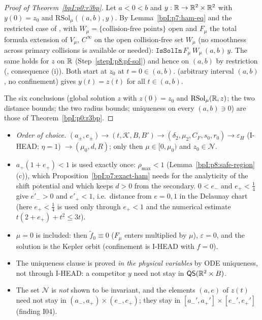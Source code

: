 \begin{proof}[Proof of Theorem~\ref{bpI:p0:r3bp}]
\label{stepI:p8:pf-uniq} Let $a<0<b$ and $y:\mathbb{R}\to\mathbb{R}^2\times\mathbb{R}^2$ with $y(0)=z_0$ and $\mathrm{RSol}_\mu((a,b),y)$. By Lemma~\ref{bpI:p7:ham-eq} and the restricted case of , with $W_\mu=\{\text{collision-free points}\}$ open and $F_\mu$ the total formula extension of $V_\mu$, $C^\infty$ on the open collision-free set $W_\mu$ (no smoothness across primary collisions is available or needed): $\texttt{IsSolIn}\,F_\mu\,W_\mu\,(a,b)\,y$. The same holds for $z$ on $\mathbb{R}$ (Step~\ref{stepI:p8:pf-sol}) and hence on $(a,b)$ by restriction (, consequence (i)). Both start at $z_0$ at $t=0\in(a,b)$.  (arbitrary interval $(a,b)$, no confinement) gives $y(t)=z(t)$ for all $t\in(a,b)$.

The six conclusions (global solution $z$ with $z(0)=z_0$ and $\mathrm{RSol}_\mu(\mathbb{R},z)$; the two distance bounds; the two radius bounds; uniqueness on every $(a,b)\ni0$) are those of Theorem~\ref{bpI:p0:r3bp}.
\end{proof}

\begin{remark}\label{bpI:p8:dependence}
\begin{itemize}
\item \emph{Order of choice.} $(a_\pm,e_\pm)\to(t,\mathcal K,B,B')\to(\delta_2,\mu_2,C_F,s_0,r_0)\to\varepsilon_H$ (I-HEAD; $\eta=1$) $\to(\mu_0,d,R)$; only then $\mu\in[0,\mu_0)$ and $z_0\in\mathcal N$.
\item \emph{$a_+(1+e_+)<1$} is used exactly once: $\rho_{\max}<1$ (Lemma~\ref{bpI:p8:safe-region}(c)), which Proposition~\ref{bpI:p7:exact-ham} needs for the analyticity of the shift potential and which keeps $d>0$ from the secondary. $0<e_-$ and $e_+<\frac14$ give $e'_->0$ and $e'_+<1$, i.e.\ distance from $e=0,1$ in the Delaunay chart (here $e_+<\tfrac14$ is used only through $e_+<1$ and the numerical estimate $t(2+e_+)+t^2\le3t$).
\item \emph{$\mu=0$} is included: then $\tilde f_0\equiv0$ ($F_\mu$ enters multiplied by $\mu$), $\varepsilon=0$, and the solution is the Kepler orbit (confinement is I-HEAD with $f=0$).
\item The uniqueness clause is proved \emph{in the physical variables} by ODE uniqueness, not through I-HEAD: a competitor $y$ need not stay in $\mathsf Q\mathsf S(\mathbb{R}^2\times B)$.
\item The set $\mathcal N$ is \emph{not} shown to be invariant, and the elements $(a,e)$ of $z(t)$ need not stay in $(a_-,a_+)\times(e_-,e_+)$; they stay in $[a_-',a_+']\times[e_-',e_+']$ (finding I04).
\end{itemize}
\end{remark}

